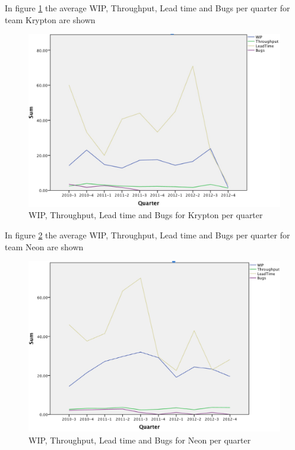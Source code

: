 \documentclass[UKenglish]{ifimaster}  %
\begin{document}
In figure \ref{Kryptonpq} the average WIP, Throughput, Lead time and Bugs per quarter for team Krypton are shown
\begin{figure}[!htbp]
\centering
\hspace*{-1.8in}
\includegraphics[scale=0.8]{Picture/Krypton/Krypton-WIP-TP-BUGS-LT.jpg}
\caption{WIP, Throughput, Lead time and Bugs for Krypton per quarter}
\label{Kryptonpq} %
\end{figure}
\newpage


In figure \ref{Neonpq} the average WIP, Throughput, Lead time and Bugs per quarter for team Neon are shown
\begin{figure}[!htbp]
\centering
\hspace*{-1.2in}
\includegraphics[scale=1.5]{Picture/Neon/Neon-WIP-TP-BUGS-LT.jpg}
\caption{WIP, Throughput, Lead time and Bugs for Neon per quarter}
\label{Neonpq} %
\end{figure}
\end{document}
